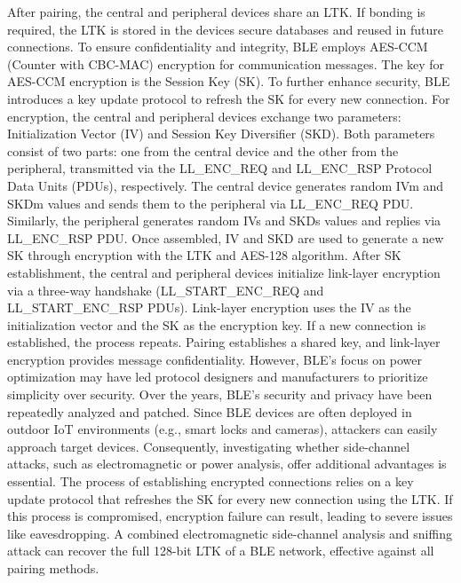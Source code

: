 \documentclass{article}
\begin{document}
After pairing, the central and peripheral devices share an LTK. If bonding is required, the LTK is stored in the devices secure databases and reused in future connections. To ensure confidentiality and integrity, BLE employs AES-CCM (Counter with CBC-MAC) encryption for communication messages. The key for AES-CCM encryption is the Session Key (SK). To further enhance security, BLE introduces a key update protocol to refresh the SK for every new connection. For encryption, the central and peripheral devices exchange two parameters: Initialization Vector (IV) and Session Key Diversifier (SKD). Both parameters consist of two parts: one from the central device and the other from the peripheral, transmitted via the LL\_ENC\_REQ and LL\_ENC\_RSP Protocol Data Units (PDUs), respectively. The central device generates random IVm and SKDm values and sends them to the peripheral via LL\_ENC\_REQ PDU. Similarly, the peripheral generates random IVs and SKDs values and replies via LL\_ENC\_RSP PDU. Once assembled, IV and SKD are used to generate a new SK through encryption with the LTK and AES-128 algorithm. After SK establishment, the central and peripheral devices initialize link-layer encryption via a three-way handshake (LL\_START\_ENC\_REQ and LL\_START\_ENC\_RSP PDUs). Link-layer encryption uses the IV as the initialization vector and the SK as the encryption key. If a new connection is established, the process repeats.
Pairing establishes a shared key, and link-layer encryption provides message confidentiality. However, BLE’s focus on power optimization may have led protocol designers and manufacturers to prioritize simplicity over security. Over the years, BLE's security and privacy have been repeatedly analyzed and patched. Since BLE devices are often deployed in outdoor IoT environments (e.g., smart locks and cameras), attackers can easily approach target devices. Consequently, investigating whether side-channel attacks, such as electromagnetic or power analysis, offer additional advantages is essential. The process of establishing encrypted connections relies on a key update protocol that refreshes the SK for every new connection using the LTK. If this process is compromised, encryption failure can result, leading to severe issues like eavesdropping. A combined electromagnetic side-channel analysis and sniffing attack can recover the full 128-bit LTK of a BLE network, effective against all pairing methods.
\end{document}

